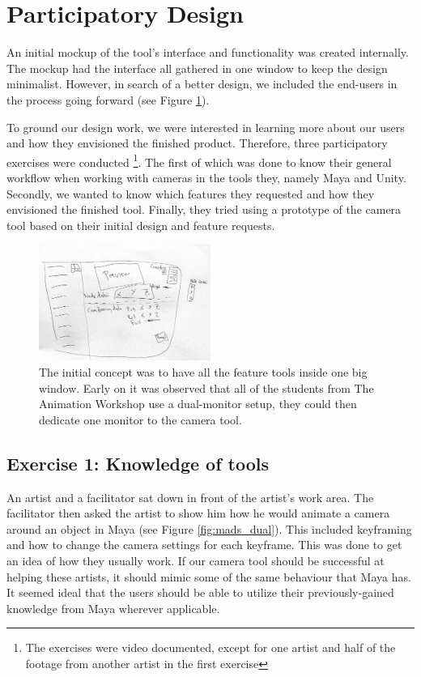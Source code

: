 \section{Participatory Design}
An initial mockup of the tool's interface and functionality was created internally. The mockup had the interface all gathered in one window to keep the design minimalist. However, in search of a better design, we included the end-users in the process going forward (see Figure \ref{fig:mockup}).

To ground our design work, we were interested in learning more about our users and how they envisioned the finished product. Therefore, three participatory exercises were conducted \footnote{The exercises were video documented, except for one artist and half of the footage from another artist in the first exercise}. The first of which was done to know their general workflow when working with cameras in the tools they, namely Maya and Unity. Secondly, we wanted to know which features they requested and how they envisioned the finished tool. Finally, they tried using a prototype of the camera tool based on their initial design and feature requests.


\begin{figure}[htbp]
\centering
\includegraphics[width=0.50\textwidth]{Pics/InitialMockup}
\caption{The initial concept was to have all the feature tools inside one big window. Early on it was observed that all of the students from The Animation Workshop use a dual-monitor setup, they could then dedicate one monitor to the camera tool.}
\label{fig:mockup}
\end{figure}

\subsection{Exercise 1: Knowledge of tools} \label{exerciseOne}
An artist and a facilitator sat down in front of the artist's work area. The facilitator then asked the artist to show him how he would animate a camera around an object in Maya (see Figure \ref{fig:mads_dual}). This included keyframing and how to change the camera settings for each keyframe. This was done to get an idea of how they usually work. If our camera tool should be successful at helping these artists, it should mimic some of the same behaviour that Maya has. It seemed ideal that the users should be able to utilize their previously-gained knowledge from Maya wherever applicable.

